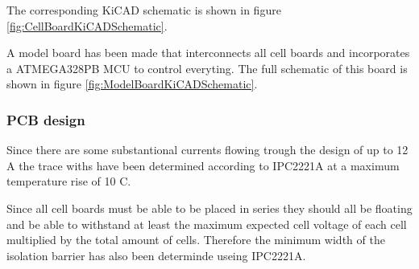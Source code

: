 The corresponding KiCAD schematic is shown in figure \ref{fig:CellBoardKiCADSchematic}.

A model board has been made that interconnects all cell boards and incorporates a ATMEGA328PB MCU to control everyting. The full schematic of this board is shown in figure \ref{fig:ModelBoardKiCADSchematic}.

\subsubsection{PCB design}
Since there are some substantional currents flowing trough the design of up to 12 A the trace withs have been determined according to IPC2221A at a maximum temperature rise of 10 \textdegree C.

Since all cell boards must be able to be placed in series they should all be floating and be able to withstand at least the maximum expected cell voltage of each cell multiplied by the total amount of cells. Therefore the minimum width of the isolation barrier has also been determinde useing IPC2221A.